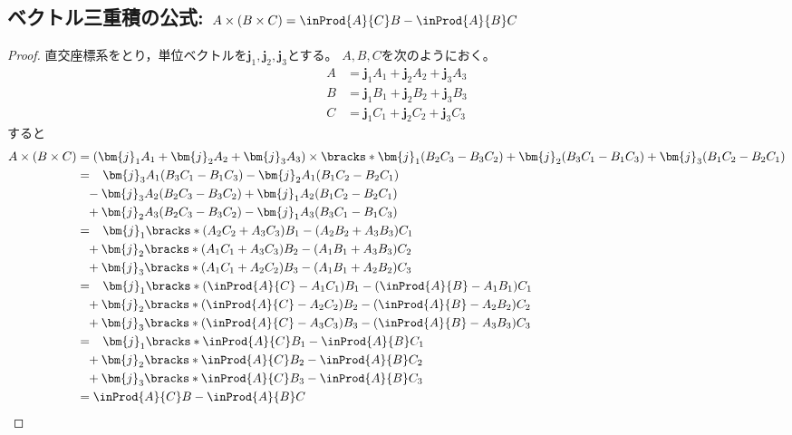         \subsection{ベクトル三重積の公式: \texorpdfstring{$A\times(B\times C) = \inProd{A}{C}B - \inProd{A}{B}C$}{A×(B×C) = (A・C)B - (A・B)C}}
            \begin{proof}
                直交座標系をとり，単位ベクトルを$\bm{j}_1,\bm{j}_2,\bm{j}_3$とする。
                $A,B,C$を次のようにおく。
                \begin{align*}
                    A &= \bm{j}_1 A_1 + \bm{j}_2 A_2 + \bm{j}_3 A_3 \\
                    B &= \bm{j}_1 B_1 + \bm{j}_2 B_2 + \bm{j}_3 B_3 \\
                    C &= \bm{j}_1 C_1 + \bm{j}_2 C_2 + \bm{j}_3 C_3
                \end{align*}
                すると
                \begin{align*}
                    A\times(B\times C) &= (\bm{j}_1 A_1 + \bm{j}_2 A_2 + \bm{j}_3 A_3) \times \bracks*{\bm{j}_1(B_2 C_3 - B_3 C_2) + \bm{j}_2(B_3 C_1 - B_1 C_3) + \bm{j}_3(B_1 C_2 - B_2 C_1)} \\
                    &= \phantom{+}\bm{j}_3 A_1(B_3 C_1 - B_1 C_3) - \bm{j}_2 A_1(B_1 C_2 - B_2 C_1) \\
                    &\phantom{=} -\bm{j}_3 A_2(B_2 C_3 - B_3 C_2) + \bm{j}_1 A_2(B_1 C_2 - B_2 C_1) \\
                    &\phantom{=} +\bm{j}_2 A_3(B_2 C_3 - B_3 C_2) - \bm{j}_1 A_3(B_3 C_1 - B_1 C_3) \\
                    &= \phantom{+}\bm{j}_1 \bracks*{(A_2 C_2 + A_3 C_3)B_1 - (A_2 B_2 + A_3 B_3)C_1} \\
                    &\phantom{=} + \bm{j}_2 \bracks*{(A_1 C_1 + A_3 C_3)B_2 - (A_1 B_1 + A_3 B_3)C_2} \\
                    &\phantom{=} + \bm{j}_3 \bracks*{(A_1 C_1 + A_2 C_2)B_3 - (A_1 B_1 + A_2 B_2)C_3} \\
                    &= \phantom{+}\bm{j}_1 \bracks*{(\inProd{A}{C} - A_1 C_1)B_1 - (\inProd{A}{B} - A_1 B_1)C_1} \\
                    &\phantom{=} + \bm{j}_2 \bracks*{(\inProd{A}{C} - A_2 C_2)B_2 - (\inProd{A}{B} - A_2 B_2)C_2} \\
                    &\phantom{=} + \bm{j}_3 \bracks*{(\inProd{A}{C} - A_3 C_3)B_3 - (\inProd{A}{B} - A_3 B_3)C_3} \\
                    &= \phantom{+}\bm{j}_1 \bracks*{\inProd{A}{C}B_1 - \inProd{A}{B}C_1} \\
                    &\phantom{=} + \bm{j}_2 \bracks*{\inProd{A}{C}B_2 - \inProd{A}{B}C_2} \\
                    &\phantom{=} + \bm{j}_3 \bracks*{\inProd{A}{C}B_3 - \inProd{A}{B}C_3} \\
                    &= \inProd{A}{C}B - \inProd{A}{B}C
                \end{align*}
            \end{proof}
